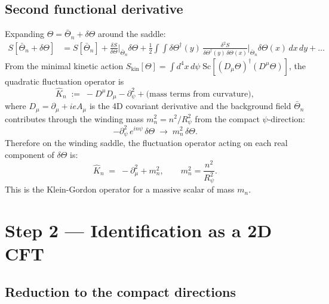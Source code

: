 \documentclass[12pt,a4paper]{article}
\theoremstyle{remark}
\begin{document}
\subsection{Second functional derivative}

Expanding $\Theta = \bar\Theta_n + \delta\Theta$ around the saddle:
\begin{align}
  S[\bar\Theta_n + \delta\Theta]
  &= S[\bar\Theta_n]
    + \frac{\delta S}{\delta\Theta}\bigg|_{\bar\Theta_n}\!\!\!\delta\Theta
    + \frac{1}{2}
      \int\!\int \delta\Theta^\dagger(y)\,
      \frac{\delta^2 S}{\delta\Theta^\dagger(y)\,\delta\Theta(x)}\bigg|_{\bar\Theta_n}\!\!\!
      \delta\Theta(x)\,dx\,dy + \ldots
  \label{eq:expansion}
\end{align}
From the minimal kinetic action
$S_{\mathrm{kin}}[\Theta] = \int d^4x\,d\psi\;\mathrm{Sc}[(D_\mu\Theta)^\dagger(D^\mu\Theta)]$,
the quadratic fluctuation operator is
\begin{equation}
  \hat{K}_n \;:=\; -D^\mu D_\mu - \partial_\psi^2 + \text{(mass terms from curvature)},
  \label{eq:K_op}
\end{equation}
where $D_\mu = \partial_\mu + ieA_\mu$ is the 4D covariant derivative and the
background field $\bar\Theta_n$ contributes through the winding mass
$m_n^2 = n^2/R_\psi^2$ from the compact $\psi$-direction:
\begin{equation}
  -\partial_\psi^2\,e^{in\psi}\,\delta\Theta
  \;\longrightarrow\; m_n^2\,\delta\Theta.
  \label{eq:winding_mass}
\end{equation}
Therefore on the winding saddle, the fluctuation operator acting on each
real component of $\delta\Theta$ is:
\begin{equation}
  \hat{K}_n \;=\; -\partial^2_\mu + m_n^2,
  \qquad m_n^2 = \frac{n^2}{R_\psi^2}.
  \label{eq:K_final}
\end{equation}
This is the Klein-Gordon operator for a massive scalar of mass $m_n$.

\section{Step 2 — Identification as a 2D CFT}
\label{sec:CFT}

\subsection{Reduction to the compact directions}
\end{document}
